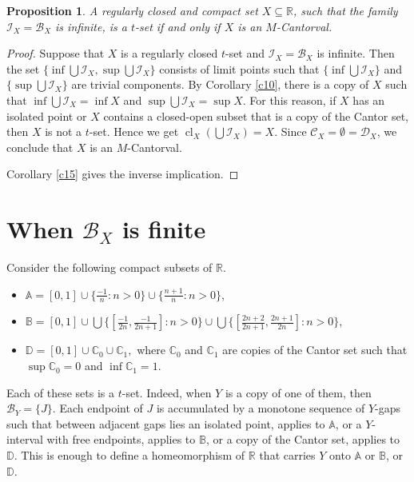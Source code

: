\documentclass[12pt,a4paper,leqno]{amsart}
\newcommand{\cl}{\operatorname{cl}}
\newtheorem{pro}[thm]{Proposition}
\theoremstyle{definition}
\begin{document}
\begin{pro}\label{p18} A regularly closed and compact set $X\subseteq \mathbb R$, such that the family $\mathcal I_X=\mathcal B_X  $ is infinite, is a $ t $-set if and only if $X$ is an $M$-Cantorval.
\end{pro}
\begin{proof} Suppose that $X$ is a regularly closed $t$-set and  $\mathcal I_X=\mathcal B_X  $ is infinite. Then the set $\{ \inf \bigcup \mathcal I_X, \sup \bigcup \mathcal I_X\}$ consists of limit 
points such that $\{\inf\bigcup \mathcal I_X\}$ and $\{ \sup \bigcup \mathcal I_X\}$ are trivial components. By Corollary  \ref{c10}, there is a copy of $X$ such that $\inf\bigcup \mathcal I_X= \inf X$ and $\sup\bigcup \mathcal I_X= \sup X$. For this reason, if $X$ has an isolated point or $X$ contains a closed-open subset that is a copy of the Cantor set, then $X$ is not a $ t $-set. Hence  we get $\cl_X (\bigcup \mathcal I_X) =X$. Since $\mathcal C_X=\emptyset= \mathcal D_X$,  we conclude that  $X$ is an $M$-Cantorval.

Corollary \ref{c15} gives the inverse implication.
\end{proof}

\section{When $\mathcal B_X $ is  finite} 
Consider the following  compact subsets of $\mathbb R$.
  \begin{itemize}
	\item  $\mathbb A = [0,1] \cup \{\frac{-1}{n}\colon n>0\} \cup \{\frac{n+1}{n}\colon n>0\}$, 
	\item  $\mathbb B = [0,1] \cup \bigcup \{[\frac{-1}{2n}, \frac{-1}{2n+1}]\colon n>0\} \cup \bigcup \{[\frac{2n+2}{2n+1}, \frac{2n+1}{2n}]\colon n>0\}$, 
	\item  $\mathbb D= [0,1] \cup \mathbb C_0 \cup \mathbb C_1,$ where $\mathbb C_0$ and $ \mathbb C_1$ are copies of the Cantor set such that $\sup \mathbb C_0 =0$ and $\inf  \mathbb C_1 =1$.
   \end{itemize} 
Each of these sets is a $t$-set. Indeed, when $Y$ is a copy of one of them, then $\mathcal B_Y=\{J\}$. Each endpoint of $J$ is accumulated by a monotone sequence of $Y$-gaps such that between adjacent gaps lies an isolated point, applies to $\mathbb A$, or a $Y$-interval with free endpoints, applies to $\mathbb B$, or a  copy of the Cantor set, applies to $\mathbb D$. This is enough to define a homeomorphism of $\mathbb R$ that carries $Y$ onto $\mathbb A$ or $\mathbb B$, or $\mathbb D$.
\end{document}
